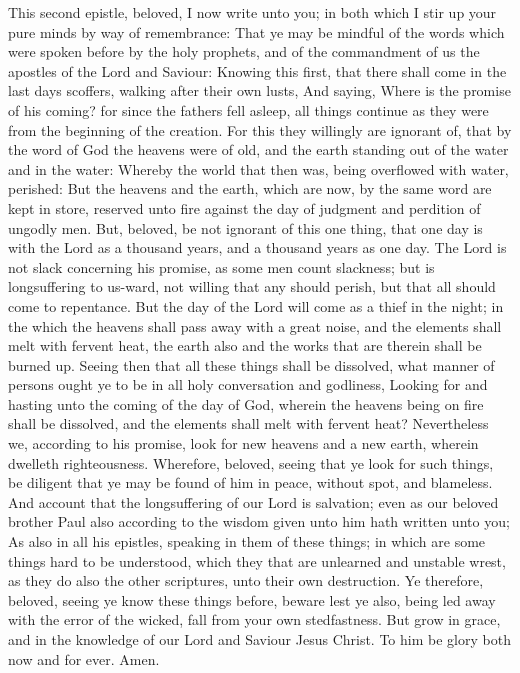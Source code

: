  This second epistle, beloved, I now write unto you; in both
which I stir up your pure minds by way of remembrance:  That
ye may be mindful of the words which were spoken before by the holy
prophets, and of the commandment of us the apostles of the Lord and
Saviour:  Knowing this first, that there shall come in the
last days scoffers, walking after their own lusts,  And
saying, Where is the promise of his coming? for since the fathers fell
asleep, all things continue as they were from the beginning of the
creation.  For this they willingly are ignorant of, that by
the word of God the heavens were of old, and the earth standing out of
the water and in the water:  Whereby the world that then
was, being overflowed with water, perished:  But the heavens
and the earth, which are now, by the same word are kept in store,
reserved unto fire against the day of judgment and perdition of ungodly
men.  But, beloved, be not ignorant of this one thing, that
one day is with the Lord as a thousand years, and a thousand years as
one day.  The Lord is not slack concerning his promise, as
some men count slackness; but is longsuffering to us-ward, not willing
that any should perish, but that all should come to repentance.
 But the day of the Lord will come as a thief in the night;
in the which the heavens shall pass away with a great noise, and the
elements shall melt with fervent heat, the earth also and the works that
are therein shall be burned up.  Seeing then that all these
things shall be dissolved, what manner of persons ought ye to be in all
holy conversation and godliness,  Looking for and hasting
unto the coming of the day of God, wherein the heavens being on fire
shall be dissolved, and the elements shall melt with fervent heat?
 Nevertheless we, according to his promise, look for new
heavens and a new earth, wherein dwelleth righteousness. 
Wherefore, beloved, seeing that ye look for such things, be diligent
that ye may be found of him in peace, without spot, and blameless.
 And account that the longsuffering of our Lord is
salvation; even as our beloved brother Paul also according to the wisdom
given unto him hath written unto you;  As also in all his
epistles, speaking in them of these things; in which are some things
hard to be understood, which they that are unlearned and unstable wrest,
as they do also the other scriptures, unto their own destruction.
 Ye therefore, beloved, seeing ye know these things before,
beware lest ye also, being led away with the error of the wicked, fall
from your own stedfastness.  But grow in grace, and in the
knowledge of our Lord and Saviour Jesus Christ. To him be glory both now
and for ever. Amen.
